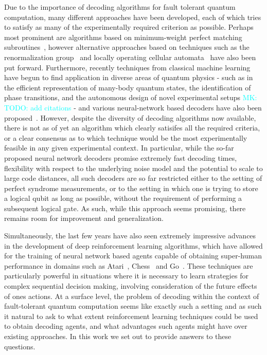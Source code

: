 \documentclass[onecolumn,preprintnumbers,amsmath,amssymb,notitlepage,nofootinbib,longbibliography,superscriptaddress,aps,pra,10pt]{revtex4-1}
\newcommand{\mk}[1]{\textcolor{Cyan}{MK: #1}}
\begin{document}
	Due to the importance of decoding algorithms for fault tolerant quantum computation, many different approaches have been developed, each of which tries to satisfy as many of the experimentally required criterion as possible.
	Perhaps most prominent are algorithms based on minimum-weight perfect matching subroutines~\cite{Fowler13}, however alternative approaches based on techniques such as the renormalization group~\cite{Duclos2010} and locally operating cellular automata~\cite{Herold15} have also been put forward.
	Furthermore, recently techniques from classical machine learning have begun to find application in diverse areas of quantum physics - such as in the efficient representation of many-body quantum states, the identification of phase transitions, and the autonomous design of novel experimental setups \mk{TODO: add citations} - and various neural-network based decoders have also been proposed~\cite{Torlai10, Varsamopoulos17, Krastanov17, Breuckmann18, Baireuther18a, Baireuther18b, Ni18}.
	However, despite the diversity of decoding algorithms now available, there is not as of yet an algorithm which clearly satisifes all the required criteria, or a clear consensus as to which technique would be the most experimentally feasible in any given experimental context.
	In particular, while the so-far proposed neural network decoders promise extremely fast decoding times, flexibility with respect to the underlying noise model and the potential to scale to large code distances, all such decoders are so far restricted either to the setting of perfect syndrome measurements, or to the setting in which one is trying to store a logical qubit as long as possible, without the requirement of performing a subsequent logical gate.
	As such, while this approach seems promising, there remains room for improvement and generalization.

	Simultaneously, the last few years have also seen extremely impressive advances in the development of deep reinforcement learning algorithms, which have allowed for the training of neural network based agents capable of obtaining super-human performance in domains such as Atari~\cite{Mnih13}, Chess~\cite{Silver17a} and Go~\cite{Silver17b}.
	These techniques are particularly powerful in situations where it is necessary to learn strategies for complex sequential decision making, involving consideration of the future effects of ones actions.
	At a surface level, the problem of decoding within the context of fault-tolerant quantum computation seems like exactly such a setting and as such it natural to ask to what extent reinforcement learning techniques could be used to obtain decoding agents, and what advantages such agents might have over existing approaches.
	In this work we set out to provide answers to these questions.
\end{document}
